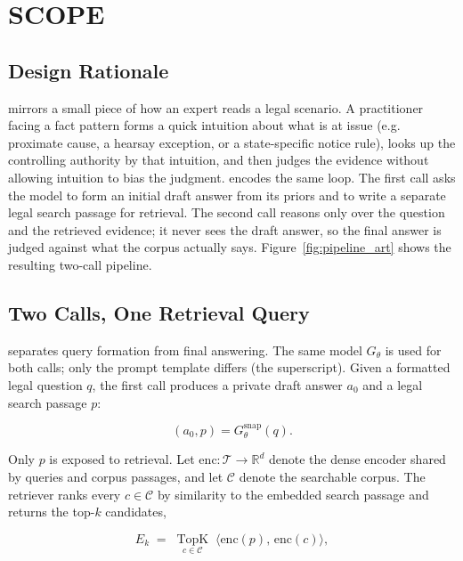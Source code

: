 \section{SCOPE}\label{sec:method}

\subsection{Design Rationale}

\hyre{} mirrors a small piece of how an expert reads a legal scenario. A
practitioner facing a fact pattern forms a quick intuition about what is at
issue (e.g. proximate cause, a hearsay exception, or a state-specific notice rule),
looks up the controlling authority by that intuition, and then judges the
evidence without allowing intuition to bias the judgment.
\hyre{} encodes the same loop. The first call asks the model to form an
initial draft answer from its priors and to write a separate legal search passage
for retrieval. The second call reasons only over the question and the
retrieved evidence; it never sees the draft answer, so the final answer is judged
against what the corpus actually says.
Figure~\ref{fig:pipeline_art} shows the resulting two-call pipeline.

\subsection{Two Calls, One Retrieval Query}\label{sec:method:snaphyre}

\hyre{} separates query formation from final answering. The same model
$G_\theta$ is used for both calls; only the prompt template differs (the
superscript). Given a formatted legal question $q$, the first call produces
a private draft answer $a_0$ and a legal search passage $p$:

\begin{equation}
(a_0, p) = G_{\theta}^{\mathrm{snap}}(q).
\end{equation}

Only $p$ is exposed to retrieval. Let
$\mathrm{enc} : \mathcal{T} \to \mathbb{R}^d$ denote the dense encoder shared
by queries and corpus passages, and let $\mathcal{C}$ denote the searchable
corpus. The retriever ranks every $c \in \mathcal{C}$ by similarity to the
embedded search passage and returns the top-$k$ candidates,

\begin{equation}
E_k \;=\; \operatorname*{TopK}_{c \in \mathcal{C}} \;\bigl\langle \mathrm{enc}(p),\, \mathrm{enc}(c) \bigr\rangle,
\end{equation}


